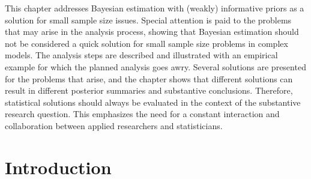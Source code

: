 \documentclass[openright,titlepage,12pt,a4paper]{book}
\begin{document}
This chapter addresses Bayesian estimation with (weakly) informative priors as a solution for small sample size issues. Special attention is paid to the problems that may arise in the analysis process, showing that Bayesian estimation should not be considered a quick solution for small sample size problems in complex models. The analysis steps are described and illustrated with an empirical example for which the planned analysis goes awry. Several solutions are presented for the problems that arise, and the chapter shows that different solutions can result in different posterior summaries and substantive conclusions. Therefore, statistical solutions should always be evaluated in the context of the substantive research question. This emphasizes the need for a constant interaction and collaboration between applied researchers and statisticians.

\normalsize
\newpage

\hypertarget{ch05introduction}{%
\section{Introduction}\label{ch05introduction}}
\end{document}
